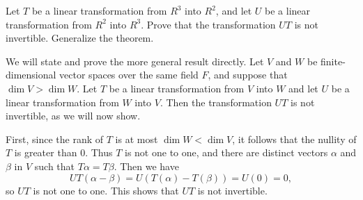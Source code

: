  Let $T$ be a linear transformation from $R^3$ into $R^2$,
and let $U$ be a linear transformation from $R^2$ into $R^3$. Prove
that the transformation $UT$ is not invertible. Generalize the
theorem.
\begin{solution}
  We will state and prove the more general result directly. Let $V$
  and $W$ be finite-dimensional vector spaces over the same field $F$,
  and suppose that $\dim V > \dim W$. Let $T$ be a linear
  transformation from $V$ into $W$ and let $U$ be a linear
  transformation from $W$ into $V$. Then the transformation $UT$ is
  not invertible, as we will now show.

  First, since the rank of $T$ is at most $\dim W < \dim V$, it
  follows that the nullity of $T$ is greater than $0$. Thus $T$ is not
  one to one, and there are distinct vectors $\alpha$ and $\beta$ in
  $V$ such that $T\alpha = T\beta$. Then we have
  \begin{equation*}
    UT(\alpha - \beta) = U(T(\alpha) - T(\beta)) = U(0) = 0,
  \end{equation*}
  so $UT$ is not one to one. This shows that $UT$ is not invertible.
\end{solution}
